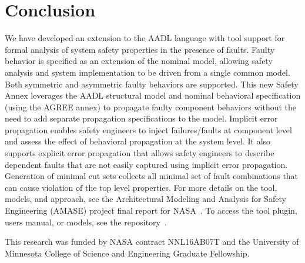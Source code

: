 \section{Conclusion}


We have developed an extension to the AADL language with tool support for formal analysis of system safety properties in the presence of faults. Faulty behavior is specified as an extension of the nominal model, allowing safety analysis and system implementation to be driven from a single common model. Both symmetric and asymmetric faulty behaviors are supported. This new Safety Annex leverages the AADL structural model and nominal behavioral specification (using the AGREE annex) to propagate faulty component behaviors without the need to add separate propagation specifications to the model. Implicit %
error propagation enables safety engineers to inject failures/faults at component level and assess the effect of behavioral propagation at the system level. It also supports explicit 
error propagation that allows safety engineers to describe dependent faults that are not easily captured using implicit %
error propagation. Generation of minimal cut sets collects all minimal set of fault combinations that can cause violation of the top level properties. 
For more details on the tool, models, and approach, see the Architectural Modeling and Analysis for Safety Engineering (AMASE) project final report for NASA~\cite{AMASEFinalReport}. 
To access the tool plugin, users manual, or models, see the repository~\cite{SAGithub}. 


\vspace{2 mm}
 This research was funded by NASA contract NNL16AB07T and the University of Minnesota College of Science and Engineering Graduate Fellowship.

